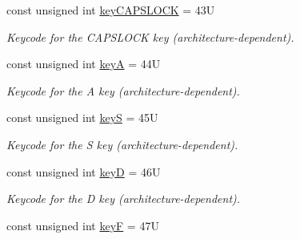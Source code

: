 \begin{DoxyCompactItemize}
\mbox{\label{namespacecimg__library__suffixed_1_1cimg_a20bf5d9bd11e638abe3e741eb0b8e2b0}} 
const unsigned int \hyperlink{namespacecimg__library__suffixed_1_1cimg_a20bf5d9bd11e638abe3e741eb0b8e2b0}{key\+C\+A\+P\+S\+L\+O\+CK} = 43U
\begin{DoxyCompactList}\small\item\em Keycode for the {\ttfamily C\+A\+P\+S\+L\+O\+CK} key (architecture-\/dependent). \end{DoxyCompactList}\item 
\mbox{\label{namespacecimg__library__suffixed_1_1cimg_aad681eddc61a8e064eeb7b98f2fd1bbd}} 
const unsigned int \hyperlink{namespacecimg__library__suffixed_1_1cimg_aad681eddc61a8e064eeb7b98f2fd1bbd}{keyA} = 44U
\begin{DoxyCompactList}\small\item\em Keycode for the {\ttfamily A} key (architecture-\/dependent). \end{DoxyCompactList}\item 
\mbox{\label{namespacecimg__library__suffixed_1_1cimg_ae3b2c413918e73f61bf4c162f0df438b}} 
const unsigned int \hyperlink{namespacecimg__library__suffixed_1_1cimg_ae3b2c413918e73f61bf4c162f0df438b}{keyS} = 45U
\begin{DoxyCompactList}\small\item\em Keycode for the {\ttfamily S} key (architecture-\/dependent). \end{DoxyCompactList}\item 
\mbox{\label{namespacecimg__library__suffixed_1_1cimg_a37b8e2602e7fc7d62f4de0a21faba490}} 
const unsigned int \hyperlink{namespacecimg__library__suffixed_1_1cimg_a37b8e2602e7fc7d62f4de0a21faba490}{keyD} = 46U
\begin{DoxyCompactList}\small\item\em Keycode for the {\ttfamily D} key (architecture-\/dependent). \end{DoxyCompactList}\item 
\mbox{\label{namespacecimg__library__suffixed_1_1cimg_a93cda80c6a027985b93f04874af982b0}} 
const unsigned int \hyperlink{namespacecimg__library__suffixed_1_1cimg_a93cda80c6a027985b93f04874af982b0}{keyF} = 47U

\end{DoxyCompactItemize}
